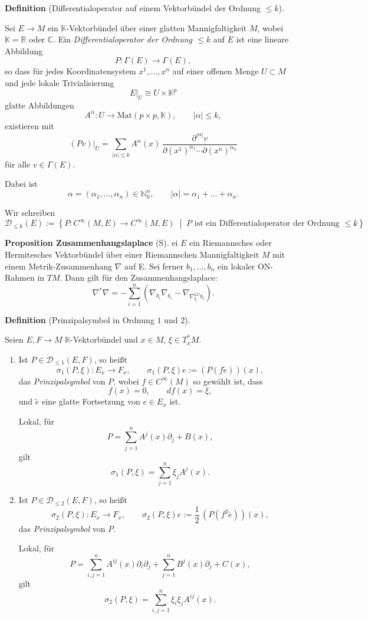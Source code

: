 \documentclass[10pt, letterpaper]{article}
\newcommand{\R}{\mathbb{R}}
\newcommand{\C}{\mathbb{C}}
\newcommand{\Mat}{\mathrm{Mat}}
\newcommand{\CustomHeading}[3]{%
  \par\medskip\noindent%
  \textbf{#1 #2} \textnormal{(#3)}.\enskip%
}
\newenvironment{DEF}[2]{\CustomHeading{Definition}{#1}{#2}}{}
\newenvironment{PROP}[2]{\CustomHeading{Proposition}{#1}{#2}}{}
\begin{document}
\begin{DEF}{}{Differentialoperator auf einem Vektorbündel der Ordnung $\le k$}
Sei $E \to M$ ein $\mathbb{K}$-Vektorbündel über einer glatten Mannigfaltigkeit $M$,
wobei $\mathbb{K}=\R$ oder $\C$.
Ein \emph{Differentialoperator der Ordnung $\le k$} auf $E$ ist eine lineare Abbildung
\[
P:\Gamma(E)\to \Gamma(E),
\]
so dass für jedes Koordinatensystem $x^1,\dots,x^n$ auf einer offenen Menge
$U\subset M$ und jede lokale Trivialisierung
\[
E|_U \cong U\times \mathbb{K}^p
\]
glatte Abbildungen
\[
A^\alpha:U\to \Mat(p\times p,\mathbb{K}),
\qquad |\alpha|\le k,
\]
existieren mit
\[
(Pv)|_U
=
\sum_{|\alpha|\le k}
A^\alpha(x)\,
\frac{\partial^{|\alpha|}v}{\partial (x^1)^{\alpha_1}\cdots \partial (x^n)^{\alpha_n}}
\]
für alle $v\in \Gamma(E)$.

Dabei ist
\[
\alpha=(\alpha_1,\dots,\alpha_n)\in \mathbb N_0^n,
\qquad
|\alpha|=\alpha_1+\dots+\alpha_n.
\]

Wir schreiben
\[
\mathscr D_{\le k}(E)
:=
\left\{
P:C^\infty(M,E)\to C^\infty(M,E)
\;\middle|\;
P \text{ ist ein Differentialoperator der Ordnung }\le k
\right\}.
\]
\end{DEF}


\begin{PROP}{Zusammenhangslaplace}
  Sei $E$ ein Riemannsches oder Hermitesches Vektorbündel über einer Riemannschen Mannigfaltigkeit $M$ mit einem Metrik-Zusammenhang $\nabla$ auf E. Sei ferner $b_1,...,b_n$ ein lokaler ON-Rahmen in $TM$. Dann gilt für den Zusammenhangslaplace:
    $$
    \nabla^* \nabla=-\sum_{i=1}^n\left(\nabla_{b_i} \nabla_{b_i}-\nabla_{\nabla_{b_i}^{\mathrm{LC}}b_i}\right) .
    $$
\end{PROP}

\begin{DEF}{}{Prinzipalsymbol in Ordnung \(1\) und \(2\)}
Seien \(E,F\to M\) \(\mathbb{K}\)-Vektorbündel und \(x\in M\), \(\xi\in T_x^*M\).

\begin{enumerate}
    \item Ist \(P\in \mathscr D_{\le 1}(E,F)\), so heißt
    \[
    \sigma_1(P,\xi):E_x\to F_x,
    \qquad
    \sigma_1(P,\xi)e:=(P(f\widetilde e))(x),
    \]
    das \emph{Prinzipalsymbol} von \(P\), wobei \(f\in C^\infty(M)\) so gewählt ist, dass
    \[
    f(x)=0,\qquad df(x)=\xi,
    \]
    und \(\widetilde e\) eine glatte Fortsetzung von \(e\in E_x\) ist.

    Lokal, für
    \[
    P=\sum_{j=1}^n A^j(x)\partial_j + B(x),
    \]
    gilt
    \[
    \sigma_1(P,\xi)=\sum_{j=1}^n \xi_j A^j(x).
    \]

    \item Ist \(P\in \mathscr D_{\le 2}(E,F)\), so heißt
    \[
    \sigma_2(P,\xi):E_x\to F_x,
    \qquad
    \sigma_2(P,\xi)e:=\frac12\,(P(f^2\widetilde e))(x),
    \]
    das \emph{Prinzipalsymbol} von \(P\).

    Lokal, für
    \[
    P=\sum_{i,j=1}^n A^{ij}(x)\partial_i\partial_j + \sum_{j=1}^n B^j(x)\partial_j + C(x),
    \]
    gilt
    \[
    \sigma_2(P,\xi)=\sum_{i,j=1}^n \xi_i\xi_j A^{ij}(x).
    \]
\end{enumerate}
\end{DEF}
\end{document}
